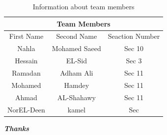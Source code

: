 \documentclass{article}
\begin{document}
\begin{table}
\centering
\begin{tabular}{|c|c|c|}
\hline 
\multicolumn{3}{|c|}{Team Members}\\
\hline
First Name & Second Name & Seaction Number \\ 
\hline 
Nahla &Mohamed Saeed & Sec 10 \\ 
\hline 
Hessain & EL-Sid & Sec 3  \\ 
\hline 
Ramadan & Adham Ali &Sec 11\\ 
\hline 
Mohamed& Hamdey &Sec 11  \\ 
\hline 
Ahmad& AL-Shahawy &Sec 11 \\ 
\hline 
NorEL-Deen&kamel&Sec \\
\hline
\end{tabular} 
\caption{Information about team members}\label{t2}
\end{table}
\newpage
\begin{center}
\Huge {\textbf{\textit{\emph{Thanks}}}}
\end{center}
\end{document}
